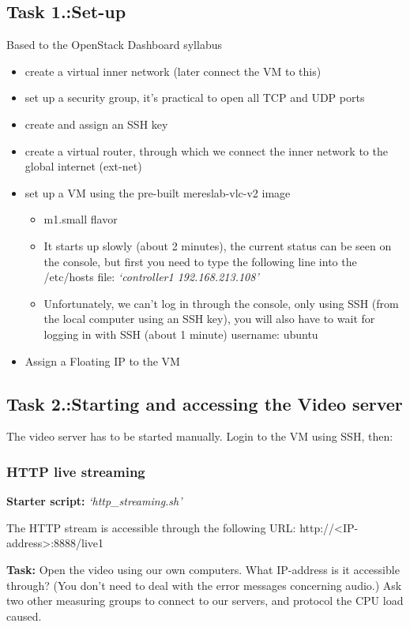 \documentclass[a4paper]{article}
\begin{document}
\subsection{Task 1.:Set-up}

Based to the OpenStack Dashboard syllabus
\begin{itemize}
\item create a virtual inner network (later connect the VM to this)
\item set up a security group, it's practical to open all TCP and UDP ports
\item create and assign an SSH key
\item create a virtual router, through which we connect the inner network to the global internet (ext-net)
\item set up a VM using the pre-built mereslab-vlc-v2 image
\begin{itemize}
\item m1.small flavor
\item It starts up slowly (about 2 minutes), the current status can be seen on the console, but first you need to type the following line into the /etc/hosts file:
         \emph{`controller1 192.168.213.108'}
\item Unfortunately, we can't log in through the console, only using SSH (from the local computer using an SSH key),
               you will also have to wait for logging in with SSH (about 1 minute)  
       username: ubuntu
\end{itemize}
\item Assign a Floating IP to the VM
\end{itemize}

\subsection{Task 2.:Starting and accessing the Video server}

The video server has to be started manually. Login to the VM using SSH, then:

\subsubsection{HTTP live streaming}
\textbf{Starter script:} \emph{`http\_streaming.sh'}

\noindent{}The HTTP stream is accessible through the following URL: http://{}\textless{}IP-address{}\textgreater{}:8888/live1 

\noindent{}\textbf{Task:} Open the video using our own computers. What IP-address is it accessible through? (You don't need to deal with the error messages concerning audio.)
Ask two other measuring groups to connect to our servers, and protocol the CPU load caused.
\end{document}
